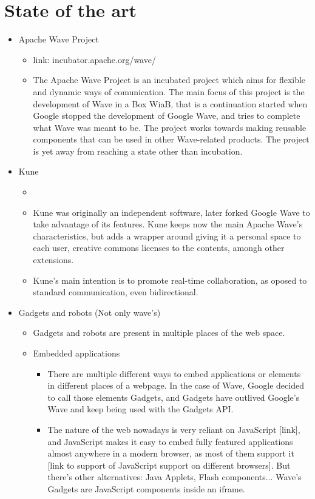 
\newpage
\section{State of the art}

\begin{itemize}
  \item Apache Wave Project
  \begin{itemize}
    \item link: incubator.apache.org/wave/
    \item The Apache Wave Project is an incubated project which aims for flexible and dynamic ways of comunication. The main focus of this project is the development of Wave in a Box WiaB, that is a continuation started when Google stopped the development of Google Wave, and tries to complete what Wave was meant to be. The project works towards making reusable components that can be used in other Wave-related products. The project is yet away from reaching a state other than incubation.
  \end{itemize}
  \item Kune
  \begin{itemize}
    \item {}
    \item Kune was originally an independent software, later forked Google Wave to take advantage of its features. Kune keeps now the main Apache Wave's characteristics, but adds a wrapper around giving it a personal space to each user, creative commons licenses to the contents, amongh other extensions.
    \item Kune's main intention is to promote real-time collaboration, as oposed to standard communication, even bidirectional.
  \end{itemize}
  \item Gadgets and robots (Not only wave's)
    \begin{itemize}
      \item Gadgets and robots are present in multiple places of the web space.
      \item Embedded applications
      \begin{itemize}
        \item There are multiple different ways to embed applications or elements in different places of a webpage. In the case of Wave, Google decided to call those elements Gadgets, and Gadgets have outlived Google's Wave and keep being used with the Gadgets API.
        \item The nature of the web nowadays is very reliant on JavaScript [link], and JavaScript makes it easy to embed fully featured applications almost anywhere in a modern browser, as most of them support it [link to support of JavaScript support on different browsers]. But there's other alternatives: Java Applets, Flash components... Wave's Gadgets are JavaScript components inside an iframe.

\end{itemize}
\end{itemize}
\end{itemize}
